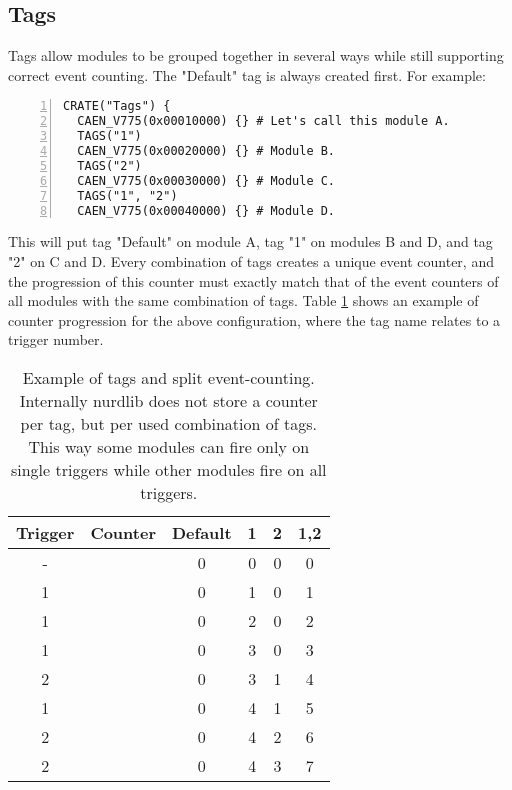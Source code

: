 \documentclass{article}
\begin{document}
\subsection{Tags}

Tags allow modules to be grouped together in several ways while still
supporting correct event counting. The "Default" tag is always created first.
For example:
\begin{Verbatim}[frame=single,numbers=left]
CRATE("Tags") {
  CAEN_V775(0x00010000) {} # Let's call this module A.
  TAGS("1")
  CAEN_V775(0x00020000) {} # Module B.
  TAGS("2")
  CAEN_V775(0x00030000) {} # Module C.
  TAGS("1", "2")
  CAEN_V775(0x00040000) {} # Module D.
\end{Verbatim}
This will put tag "Default" on module A, tag "1" on modules B and D, and tag
"2" on C and D. Every combination of tags creates a unique event counter, and
the progression of this counter must exactly match that of the event counters
of all modules with the same combination of tags. Table \ref{tab_tags} shows
an example of counter progression for the above configuration, where the tag
name relates to a trigger number.

\begin{table}
\begin{center}
\begin{tabular}{c|ccccc}
Trigger & Counter & Default & 1 & 2 & 1,2 \\
\hline
      - &         &       0 & 0 & 0 &   0 \\
      1 &         &       0 & 1 & 0 &   1 \\
      1 &         &       0 & 2 & 0 &   2 \\
      1 &         &       0 & 3 & 0 &   3 \\
      2 &         &       0 & 3 & 1 &   4 \\
      1 &         &       0 & 4 & 1 &   5 \\
      2 &         &       0 & 4 & 2 &   6 \\
      2 &         &       0 & 4 & 3 &   7 \\
\end{tabular}
\end{center}
\caption{Example of tags and split event-counting. Internally nurdlib does not
store a counter per tag, but per used combination of tags. This way some
modules can fire only on single triggers while other modules fire on all
triggers.}
\label{tab_tags}
\end{table}
\end{document}
